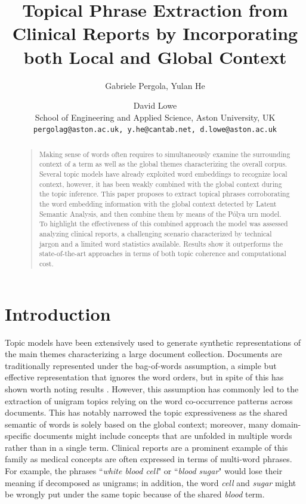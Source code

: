 \documentclass[letterpaper]{article}
\begin{document}
%
\title{Topical Phrase Extraction from Clinical Reports by Incorporating both Local and Global Context}
\author{Gabriele Pergola, Yulan He \and David Lowe\\
 School of Engineering and Applied Science, Aston University, UK\\
  {\tt pergolag@aston.ac.uk, y.he@cantab.net, d.lowe@aston.ac.uk}
}

\maketitle
\begin{abstract}
\begin{quote}

Making sense of words often requires to simultaneously examine the surrounding context of a term as well as the global themes characterizing the overall corpus. Several topic models have already exploited word embeddings to recognize local context, however, it has been weakly combined with the global context during the topic inference.
This paper proposes to extract topical phrases corroborating the word embedding information with the global context detected by Latent Semantic Analysis, and then combine them by means of the P\'{o}lya urn model. To highlight the effectiveness of this combined approach the model was assessed analyzing clinical reports, a challenging scenario characterized by technical jargon and a limited word statistics available. Results show it outperforms the state-of-the-art approaches in terms of both topic coherence and computational cost.

\end{quote}
\end{abstract}

\section{Introduction}
Topic models have been extensively used to generate synthetic representations of the main themes characterizing a large document collection. Documents are traditionally represented under the bag-of-words assumption, a simple but effective representation that ignores the word orders, but in spite of this has shown worth noting results \cite{Blei03}.
However, this assumption has commonly led to the extraction of unigram topics relying on the word co-occurrence patterns across documents. This has notably narrowed the topic expressiveness as the shared semantic of words is solely based on the global context; moreover, many domain-specific documents might include concepts that are unfolded in multiple words rather than in a single term.
Clinical reports are a prominent example of this family as medical concepts are often expressed in terms of multi-word phrases. For example, the phrases ``\textit{white blood cell}" or ``\textit{blood sugar}" would lose their meaning if decomposed as unigrams; in addition, the word \textit{cell} and \textit{sugar} might be wrongly put under the same topic because of the shared \textit{blood} term.
\end{document}
